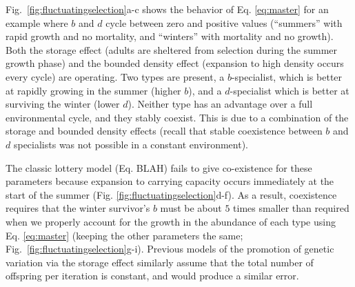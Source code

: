 \documentclass[11pt]{article}
\begin{document}
Fig.~\ref{fig:fluctuatingselection}a-c shows the behavior of Eq. \eqref{eq:master} for an example where $b$ and $d$ cycle between zero and positive values (``summers'' with rapid growth and no mortality, and ``winters'' with mortality and no growth). Both the storage effect (adults are sheltered from selection during the summer growth phase) and the bounded density effect (expansion to high density occurs every cycle) are operating. Two types are present, a $b$-specialist, which is better at rapidly growing in the summer (higher $b$), and a $d$-specialist which is better at surviving the winter (lower $d$). Neither type has an advantage over a full environmental cycle, and they stably coexist. This is due to a combination of the storage and bounded density effects (recall that stable coexistence between $b$ and $d$ specialists was not possible in a constant environment). 

The classic lottery model (Eq. BLAH) fails to give co-existence for these parameters because expansion to carrying capacity occurs immediately at the start of the summer (Fig. \ref{fig:fluctuatingselection}d-f). As a result, coexistence requires that the winter survivor's $b$ must be about $5$ times smaller than required when we properly account for the growth in the abundance of each type using Eq. \eqref{eq:master} (keeping the other parameters the same; Fig.~\ref{fig:fluctuatingselection}g-i). Previous models of the promotion of genetic variation via the storage effect  \citep{ellner_1994} similarly assume that the total number of offspring per iteration is constant, and would produce a similar error. 
\end{document}
